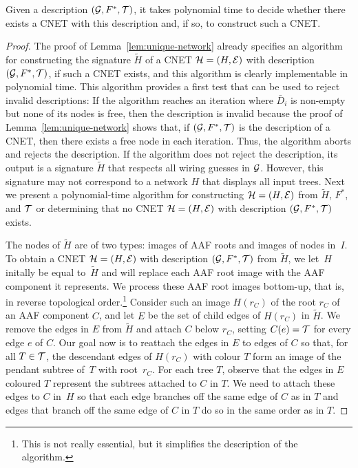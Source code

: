 \begin{lem}
  \label{lem:network-from-description}
  Given a description $(\mathcal{G}, F^*, \mathcal{T})$, it takes polynomial time to decide
  whether there exists a CNET with this description
  and, if so, {to} construct such a CNET.
\end{lem}

\begin{proof}
  The proof of Lemma~\ref{lem:unique-network} already specifies an algorithm
  for constructing the signature $\tilde H$ of a CNET $\mathcal{H} = (H, \mathcal{E})$ with
  description $(\mathcal{G}, F^*, \mathcal{T})$, if such a CNET exists, and this algorithm is
  clearly implementable in polynomial time.
  This algorithm provides a first test that can be used to reject invalid
  descriptions:
  If the algorithm reaches an iteration where $\bar D_i$ is non-empty but none   of its nodes is free, then the description is invalid because   the proof of Lemma~\ref{lem:unique-network} shows that, if $(\mathcal{G}, F^*, \mathcal{T})$   is the description of a CNET, then there exists   a free node in each iteration.   Thus, the algorithm aborts and rejects the description.   If the algorithm does not reject the description, its output is a signature   $\tilde H$ that respects all wiring guesses in $\mathcal{G}$.   However, this signature may not correspond to a network $H$ that displays   all input trees.   Next we present a polynomial-time algorithm for constructing $\mathcal{H} = (H, \mathcal{E})$   from $\tilde H$, $F^*$, and $\mathcal{T}$ or determining that no CNET $\mathcal{H} = (H, \mathcal{E})$   with description $(\mathcal{G}, F^*, \mathcal{T})$ exists.

  The nodes of $\tilde H$ are of two types: images of AAF roots and images of   {nodes in~$I$.}   To obtain a CNET $\mathcal{H} = (H, \mathcal{E})$ with description $(\mathcal{G}, F^*, \mathcal{T})$ from   $\tilde H$, {we let~$H$ initally be equal to~$\tilde H$ and will} replace each AAF root image with the AAF component it represents.   We process these AAF root images bottom-up, that is, in reverse topological   order.\footnote{This is not really essential, but it simplifies the     description of the algorithm.}   Consider such an image $H(r_C)$ of the root $r_C$ of an AAF component $C$, and   let $E$ be the set of child edges of $H(r_C)$ in $\tilde H$.   We remove the edges in $E$ from $\tilde H$ and attach $C$ below $r_C$, setting   $C(e) = \mathcal{T}$ for every edge $e$ of $C$.   Our goal now is to reattach the edges in $E$ to edges of $C$ so that, for all   $T \in \mathcal{T}$, the descendant edges of $H(r_C)$ with colour $T$ form an image   of the {pendant subtree of~$T$ with root~$r_C$}.   For each tree $T$, observe that the edges in $E$ coloured $T$ represent the  {subtrees attached to} $C$ in $T$.   We need to attach these edges to $C$ {in~$H$} so that each edge branches off the same edge of $C$ as in $T$ and edges that branch off the same edge of $C$ in $T$ do so in the same order as in $T$.


\end{proof}
